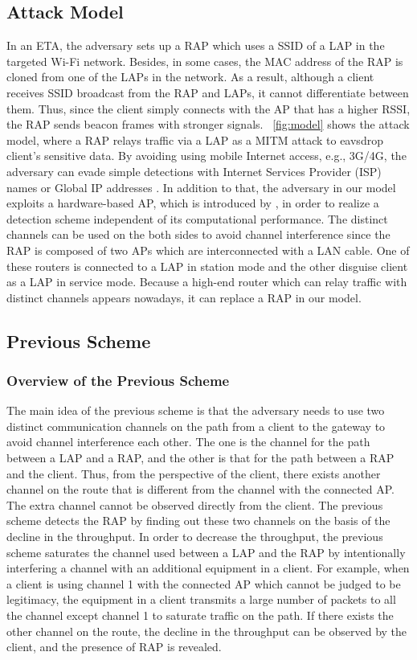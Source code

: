 \documentclass[conference]{IEEEtran}
\begin{document}
\subsection{Attack Model}
In an ETA, the adversary sets up a RAP which uses a SSID of a LAP in the targeted Wi-Fi network.
Besides, in some cases, the MAC address of the RAP is cloned from one of the LAPs in the network\cite{spoof-evi}.
As a result, although a client receives SSID broadcast from the RAP and LAPs, it cannot differentiate between them.
Thus, since the client simply connects with the AP that has a higher RSSI, the RAP sends beacon frames with stronger signals.
\figurename~\ref{fig:model} shows the attack model, where a RAP relays traffic via a LAP as a MITM attack to eavsdrop client's sensitive data.
By avoiding using mobile Internet access, e.g., 3G/4G, the adversary can evade simple detections with Internet Services Provider (ISP) names or Global IP addresses \cite{rtt}.
In addition to that, the adversary in our model exploits a hardware-based AP, which is introduced by \cite{previous}, in order to realize a detection scheme independent of its computational performance.
The distinct channels can be used on the both sides to avoid channel interference since the RAP is composed of two APs which are interconnected with a LAN cable.
One of these routers is connected to a LAP in station mode and the other disguise client as a LAP in service mode.
Because a high-end router which can relay traffic with distinct channels appears nowadays, it can replace a RAP in our model.

\subsection{Previous Scheme}
\subsubsection{Overview of the Previous Scheme}
The main idea of the previous scheme \cite{previous} is that the adversary needs to use two distinct communication channels on the path from a client to the gateway to avoid channel interference each other.
The one is the channel for the path between a LAP and a RAP, and the other is that for the path between a RAP and the client.
Thus, from the perspective of the client, there exists another channel on the route that is different from the channel with the connected AP.
The extra channel cannot be observed directly from the client.
The previous scheme detects the RAP by finding out these two channels on the basis of the decline in the throughput.
In order to decrease the throughput, the previous scheme saturates the channel used between a LAP and the RAP by intentionally interfering a channel with an additional equipment in a client.
For example, when a client is using channel 1 with the connected AP which cannot be judged to be legitimacy, the equipment in a client transmits a large number of packets to all the channel except channel 1 to saturate traffic on the path.
If there exists the other channel on the route, the decline in the throughput can be observed by the client, and the presence of RAP is revealed.
\end{document}

